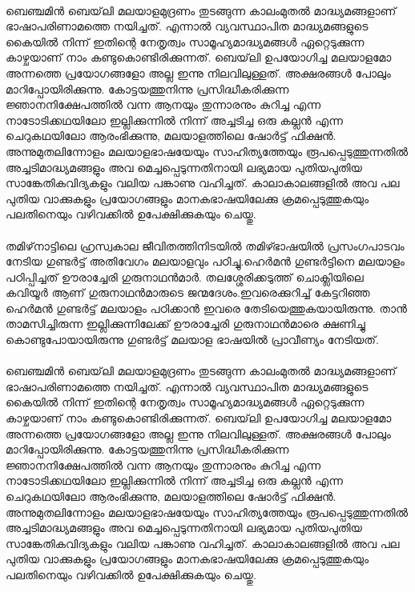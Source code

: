 \paragraph{}
ബെഞ്ചമിൻ ബെയ്‌ലി മലയാളമുദ്രണം തുടങ്ങുന്ന കാലംമുതൽ മാദ്ധ്യമങ്ങളാണ് ഭാഷാപരിണാമത്തെ നയിച്ചത്. എന്നാൽ വ്യവസ്ഥാപിത മാദ്ധ്യമങ്ങളുടെ കൈയിൽ നിന്ന് ഇതിന്റെ നേതൃത്വം സാമൂഹ്യമാദ്ധ്യമങ്ങൾ ഏറ്റെടുക്കുന്ന കാഴ്ചയാണ് നാം കണ്ടുകൊണ്ടിരിക്കുന്നത്. ബെയ്‌ലി ഉപയോഗിച്ച മലയാളമോ അന്നത്തെ പ്രയോഗങ്ങളോ അല്ല ഇന്നു നിലവിലുള്ളത്. അക്ഷരങ്ങൾ പോലും മാറിപ്പോയിരിക്കുന്നു. കോട്ടയത്തുനിന്നു പ്രസിദ്ധീകരിക്കുന്ന ജ്ഞാനനിക്ഷേപത്തിൽ വന്ന ആനയും തുന്നാരനും കുറിച്ച എന്ന നാടോടിക്കഥയിലോ ഇല്ലിക്കുന്നിൽ നിന്ന് അച്ചടിച്ച ഒരു കല്ലൻ എന്ന ചെറുകഥയിലോ ആരംഭിക്കുന്നു, മലയാളത്തിലെ ഷോർട്ട് ഫിക്ഷൻ. അന്നുമുതലിന്നോളം മലയാളഭാഷയേയും സാഹിത്യത്തേയും രൂപപ്പെടുത്തുന്നതിൽ അച്ചടിമാദ്ധ്യമങ്ങളും അവ മെച്ചപ്പെടുന്നതിനായി ലഭ്യമായ പുതിയപുതിയ സാങ്കേതികവിദ്യകളും വലിയ പങ്കാണു വഹിച്ചത്. കാലാകാലങ്ങളിൽ അവ പല പുതിയ വാക്കുകളും പ്രയോഗങ്ങളും മാനകഭാഷയിലേക്കു ക്രമപ്പെടുത്തുകയും പലതിനെയും വഴിവക്കിൽ ഉപേക്ഷിക്കുകയും ചെയ്തു\cite{bailey}. 

\paragraph{}
തമിഴ്‌നാട്ടിലെ ഹ്രസ്വകാല ജീവിതത്തിനിടയിൽ തമിഴ്ഭാഷയിൽ പ്രസംഗപാടവം നേടിയ ഗുണ്ടർട്ട് അതിവേഗം മലയാളവും പഠിച്ചു.ഹെർമൻ ഗുണ്ടർട്ടിനെ മലയാളം പഠിപ്പിച്ചത് ഊരാച്ചേരി ഗുരുനാഥൻമാർ. തലശ്ശേരിക്കടുത്ത് ചൊക്ലിയിലെ കവിയൂർ ആണ് ഗുരുനാഥൻമാരുടെ ജന്മദേശം.ഇവരെക്കുറിച്ച് കേട്ടറിഞ്ഞ ഹെർമൻ ഗുണ്ടർട്ട് മലയാളം പഠിക്കാൻ ഇവരെ തേടിയെത്തുകയായിരുന്നു. താൻ താമസിച്ചിരുന്ന ഇല്ലിക്കുന്നിലേക്ക് ഊരാച്ചേരി ഗുരുനാഥൻമാരെ ക്ഷണിച്ചു കൊണ്ടുപോയായിരുന്നു ഗുണ്ടർട്ട് മലയാള ഭാഷയിൽ പ്രാവീണ്യം നേടിയത്. 

\paragraph{}
ബെഞ്ചമിൻ ബെയ്‌ലി മലയാളമുദ്രണം തുടങ്ങുന്ന കാലംമുതൽ മാദ്ധ്യമങ്ങളാണ് ഭാഷാപരിണാമത്തെ നയിച്ചത്. എന്നാൽ വ്യവസ്ഥാപിത മാദ്ധ്യമങ്ങളുടെ കൈയിൽ നിന്ന് ഇതിന്റെ നേതൃത്വം സാമൂഹ്യമാദ്ധ്യമങ്ങൾ ഏറ്റെടുക്കുന്ന കാഴ്ചയാണ് നാം കണ്ടുകൊണ്ടിരിക്കുന്നത്. ബെയ്‌ലി ഉപയോഗിച്ച മലയാളമോ അന്നത്തെ പ്രയോഗങ്ങളോ അല്ല ഇന്നു നിലവിലുള്ളത്. അക്ഷരങ്ങൾ പോലും മാറിപ്പോയിരിക്കുന്നു. കോട്ടയത്തുനിന്നു പ്രസിദ്ധീകരിക്കുന്ന ജ്ഞാനനിക്ഷേപത്തിൽ വന്ന ആനയും തുന്നാരനും കുറിച്ച എന്ന നാടോടിക്കഥയിലോ ഇല്ലിക്കുന്നിൽ നിന്ന് അച്ചടിച്ച ഒരു കല്ലൻ എന്ന ചെറുകഥയിലോ ആരംഭിക്കുന്നു, മലയാളത്തിലെ ഷോർട്ട് ഫിക്ഷൻ. അന്നുമുതലിന്നോളം മലയാളഭാഷയേയും സാഹിത്യത്തേയും രൂപപ്പെടുത്തുന്നതിൽ അച്ചടിമാദ്ധ്യമങ്ങളും അവ മെച്ചപ്പെടുന്നതിനായി ലഭ്യമായ പുതിയപുതിയ സാങ്കേതികവിദ്യകളും വലിയ പങ്കാണു വഹിച്ചത്. കാലാകാലങ്ങളിൽ അവ പല പുതിയ വാക്കുകളും പ്രയോഗങ്ങളും മാനകഭാഷയിലേക്കു ക്രമപ്പെടുത്തുകയും പലതിനെയും വഴിവക്കിൽ ഉപേക്ഷിക്കുകയും ചെയ്തു\cite{bailey}. 


